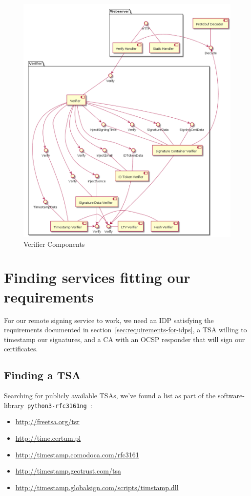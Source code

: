 \begin{figure}
    \begin{center}
        \includegraphics[width=0.7\linewidth]{images/verifier_components.png}
        \caption{Verifier Components}
        \label{fig:verifiercomponents}
    \end{center}
\end{figure}



\section{Finding services fitting our requirements}\label{sec:finding-services-fitting-our-requirements}

For our remote signing service to work,
we need an \gls{IDP} satisfying the requirements documented in section~\ref{sec:requirements-for-idps},
a \gls{TSA} willing to timestamp our signatures,
and a \gls{CA} with an \gls{OCSP} responder that will sign our certificates.

\subsection{Finding a TSA}\label{subsec:finding-a-tsa}
Searching for publicly available \gls{TSA}s, we've found a list as part of the software-library~\texttt{python3-rfc3161ng}~\cite{pythonrfc3161}:
\begin{itemize}
    \item \url{http://freetsa.org/tsr}
    \item \url{http://time.certum.pl}
    \item \url{http://timestamp.comodoca.com/rfc3161}
    \item \url{http://timestamp.geotrust.com/tsa}
    \item \url{http://timestamp.globalsign.com/scripts/timstamp.dll}
\end{itemize}

